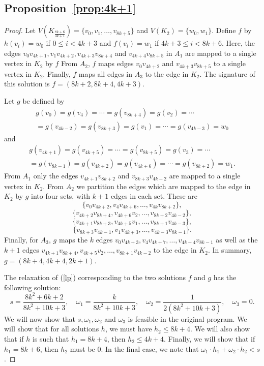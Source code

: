 \documentclass[11pt,a4paper]{article}
\begin{document}
\subsection*{Proposition~\ref{prop:4k+1}}
\begin{proof}
Let $V(K_{\frac{8k+6}{4k+1}}) = \{v_0,v_1,\ldots,v_{8k+5}\}$ and $V(K_2) = \{w_0,w_1\}$. 
Define $f$ by $h(v_i) = w_0$ if $0 \leq i < 4k+3$ and $f(v_i) = w_1$ if $4k+3 \leq i < 8k+6$.
Here, the edges $v_0 v_{4k+1},v_1 v_{4k+2},v_{4k+3} v_{8k+4}$ and 
$v_{4k+4} v_{8k+5}$ in $A_1$ are mapped to a single vertex in $K_2$ by $f$
From $A_2$, $f$ maps edges $v_0 v_{4k+2}$ and $v_{4k+3} v_{8k+5}$ to a single 
vertex in $K_2$.
Finally, $f$ maps all edges in $A_3$ to the edge in $K_2$.
The signature of this solution is $f=(8k+2,8k+4,4k+3)$.

Let $g$ be defined by
\begin{multline*}
g(v_0)=g(v_4)=\cdots=g(v_{8k+4})=g(v_2)=\cdots \\
=g(v_{4k-2})=g(v_{8k+3})=g(v_1)=\cdots=g(v_{4k-3})=w_0
\end{multline*}
and 
\begin{multline*}
g(v_{4k+1})=g(v_{4k+5})=\cdots=g(v_{8k+5})=g(v_3)=\cdots \\
=g(v_{8k-1})=g(v_{4k+2})=g(v_{4k+6})=\cdots=g(v_{8k+2})=w_1.
\end{multline*}
From $A_1$ only the edges $v_{4k+1} v_{8k+2}$ and $v_{8k+3} v_{4k-2}$ are mapped to
a single vertex in $K_2$. From $A_2$ we partition the edges which are mapped to
the edge in $K_2$ by $g$ into four sets, with $k+1$ edges in each set. These are
\[
\{ v_0 v_{4k+2},v_4 v_{4k+6},\ldots,v_{4k} v_{8k+2} \},
\]
\[
\{ v_{4k+2} v_{8k+4}, v_{4k+6} v_2,\ldots,v_{8k+2} v_{4k-2} \},
\]
\[
\{ v_{4k+1} v_{8k+3},v_{4k+5} v_1,\ldots,v_{8k+1} v_{4k-3} \},
\]
\[
\{ v_{8k+3} v_{4k-1}, v_1 v_{4k+3},\ldots,v_{4k-3} v_{8k-1} \}.
\]
Finally, for $A_3$, $g$ maps the $k$ edges 
$v_0 v_{4k+3},v_4 v_{4k+7},\ldots,v_{4k-4} v_{8k-1}$ as well as the $k+1$ edges 
$v_{4k+1} v_{8k+4},v_{4k+5} v_2,\ldots,v_{8k+1} v_{4k-2}$ to the edge in $K_2$.
In summary, $g=(8k+4,4k+4,2k+1)$.

The relaxation of (\ref{lp}) corresponding to the two solutions $f$ and $g$ has
the following solution:
\[
s=\frac{8k^2+6k+2}{8k^2+10k+3}, \quad \omega_1=\frac{k}{8k^2+10k+3}, \quad \omega_2=\frac{1}{2(8k^2+10k+3)}, \quad \omega_3=0.
\]
We will now show that $s, \omega_1, \omega_2$ and $\omega_3$ is feasible in
the original program.
We will show that for all solutions $h$, we must have $h_2 \leq 8k+4$.
We will also show that if $h$ is such that $h_1 = 8k+4$, then
$h_2 \leq 4k+4$.
Finally, we will show that if $h_1 = 8k+6$, then $h_2$ must be 0.
In the final case, we note that $\omega_1 \cdot h_1 + \omega_2 \cdot h_2 < s$.


\end{proof}
\end{document}
